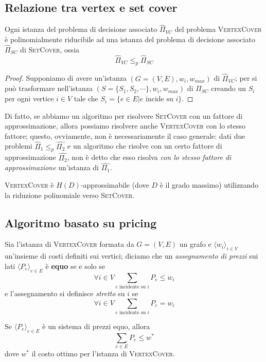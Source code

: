\subsection{Relazione tra vertex e set cover}
\begin{theorem}\label{thm:vc_polyred_sc}
	Ogni istanza del problema di decisione associato $\hat{\Pi}_{VC}$ del problema \textsc{VertexCover} è
	polinomialmente riducibile ad una istanza del problema di decisione associato
	$\hat{\Pi}_{SC}$ di \textsc{SetCover}, ossia
	$$
		\hat{\Pi}_{VC} \leq_p \hat{\Pi}_{SC}
	$$
\end{theorem}
\begin{proof}
	Supponiamo di avere un'istanza $(G=(V,E), w_i, w_{max})$ di
	$\hat{\Pi}_{VC}$; per si può trasformare nell'istanza
	$(S= \{S_1, S_2, \cdots\}, w_i, w_{max})$ di $\hat{\Pi}_{SC}$ creando
	un $S_i$ per ogni vertice $i \in V$ tale che $S_i = \{e \in E | e \text{ incide su } i\}$.
\end{proof}

Di fatto, se abbiamo un algoritmo per
risolvere \textsc{SetCover} con un fattore di approssimazione, allora possiamo
risolvere anche \textsc{VertexCover} con lo stesso fattore;
questo, ovviamente, non è necessariamente il caso generale: dati due problemi
$\hat{\Pi}_1 \leq_p \hat{\Pi_2}$ e un algoritmo che risolve con un certo fattore
di approssimazione $\hat{\Pi_2}$, non è detto che esso risolva
\textit{con lo stesso fattore di approssimazione} un'istanza di $\hat{\Pi_1}$.

\begin{theorem}
	\textsc{VertexCover} è $H(D)$-approssimabile (dove $D$ è il grado massimo)
	utilizzando la riduzione polinomiale verso \textsc{SetCover}.
\end{theorem}

\subsection{Algoritmo basato su pricing}
Sia l'istanza di \textsc{VertexCover} formata da $G = (V,E)$ un grafo e
$\langle w_i \rangle_{i \in V}$ un'insieme di costi definiti
sui vertici; diciamo che un \textit{assegnamento di prezzi} sui lati
$\langle P_e \rangle_{e \in E}$ è \textbf{equo} se e solo se
$$
	\forall i \in V \sum_{e \text{ incidente su } i} P_e \leq w_i
$$
e l'assegnamento si definisce \textit{stretto} su $i$ se
$$
	\forall i \in V \sum_{e \text{ incidente su } i} P_e = w_i
$$
\begin{lemma}\label{lem:vcov_pricing_eq_sum_p_e_w_opt}
	Se $\langle P_e \rangle_{e \in E}$ è un sistema di prezzi equo, allora
	$$
		\sum_{e \in E} P_e \leq w^*
	$$
	dove $w^*$ il costo ottimo per l'istanza di \textsc{VertexCover}.
\end{lemma}


